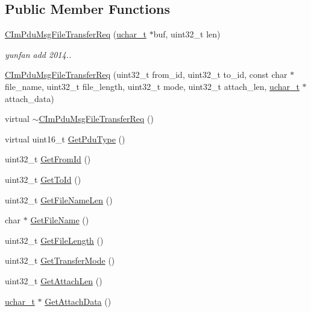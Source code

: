 \subsection*{Public Member Functions}
\begin{DoxyCompactItemize}
\item 
\hyperlink{class_c_im_pdu_msg_file_transfer_req_ab7a090d49ab1ca31dec4e5460ae1c86e}{C\+Im\+Pdu\+Msg\+File\+Transfer\+Req} (\hyperlink{base_2ostype_8h_a124ea0f8f4a23a0a286b5582137f0b8d}{uchar\+\_\+t} $\ast$buf, uint32\+\_\+t len)
\begin{DoxyCompactList}\small\item\em yunfan add 2014.. \end{DoxyCompactList}\item 
\hyperlink{class_c_im_pdu_msg_file_transfer_req_ad7c93a9d39b476b7a393c0cf863dcb27}{C\+Im\+Pdu\+Msg\+File\+Transfer\+Req} (uint32\+\_\+t from\+\_\+id, uint32\+\_\+t to\+\_\+id, const char $\ast$file\+\_\+name, uint32\+\_\+t file\+\_\+length, uint32\+\_\+t mode, uint32\+\_\+t attach\+\_\+len, \hyperlink{base_2ostype_8h_a124ea0f8f4a23a0a286b5582137f0b8d}{uchar\+\_\+t} $\ast$attach\+\_\+data)
\item 
virtual \hyperlink{class_c_im_pdu_msg_file_transfer_req_a444435d1cc07e6ae785a75883a9da17e}{$\sim$\+C\+Im\+Pdu\+Msg\+File\+Transfer\+Req} ()
\item 
virtual uint16\+\_\+t \hyperlink{class_c_im_pdu_msg_file_transfer_req_afe3d1858a12935eea096145665ea00a0}{Get\+Pdu\+Type} ()
\item 
uint32\+\_\+t \hyperlink{class_c_im_pdu_msg_file_transfer_req_a837763b337b811dcc6adbe5c053f1791}{Get\+From\+Id} ()
\item 
uint32\+\_\+t \hyperlink{class_c_im_pdu_msg_file_transfer_req_aeeffe3320e93175efe3ad3dab7e9575a}{Get\+To\+Id} ()
\item 
uint32\+\_\+t \hyperlink{class_c_im_pdu_msg_file_transfer_req_ab07ccc3a7a43a86c3eda8d0893ba25e9}{Get\+File\+Name\+Len} ()
\item 
char $\ast$ \hyperlink{class_c_im_pdu_msg_file_transfer_req_ae7443f22aa14ad1b77403b025abce3b2}{Get\+File\+Name} ()
\item 
uint32\+\_\+t \hyperlink{class_c_im_pdu_msg_file_transfer_req_aa3190f9ba58e8bcf135545d96e76072a}{Get\+File\+Length} ()
\item 
uint32\+\_\+t \hyperlink{class_c_im_pdu_msg_file_transfer_req_a8887061194cfb7ade9bd6821d81a4707}{Get\+Transfer\+Mode} ()
\item 
uint32\+\_\+t \hyperlink{class_c_im_pdu_msg_file_transfer_req_aaeccd4695b5f479612a85f1bdd2805a2}{Get\+Attach\+Len} ()
\item 
\hyperlink{base_2ostype_8h_a124ea0f8f4a23a0a286b5582137f0b8d}{uchar\+\_\+t} $\ast$ \hyperlink{class_c_im_pdu_msg_file_transfer_req_a55a0f372de19d74313da915d55257fc3}{Get\+Attach\+Data} ()
\end{DoxyCompactItemize}
